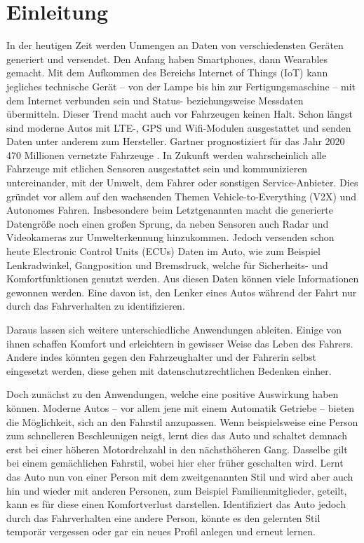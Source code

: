 %
%
%
%
%


\chapter{Einleitung}
\label{chap:intro}

In der heutigen Zeit werden Unmengen an Daten von verschiedensten Geräten generiert und versendet. Den Anfang haben Smartphones, dann Wearables gemacht. Mit dem Aufkommen des Bereichs Internet of Things (IoT) kann jegliches technische Gerät – von der Lampe bis hin zur Fertigungsmaschine – mit dem Internet verbunden sein und Status- beziehungsweise Messdaten übermitteln. Dieser Trend macht auch vor Fahrzeugen keinen Halt. Schon längst sind moderne Autos mit LTE-, GPS und Wifi-Modulen ausgestattet und senden Daten unter anderem zum Hersteller. Gartner prognostiziert für das Jahr 2020 470 Millionen vernetzte Fahrzeuge \cite{Gartner2019}. In Zukunft werden wahrscheinlich alle Fahrzeuge mit etlichen Sensoren ausgestattet sein und kommunizieren untereinander, mit der Umwelt, dem Fahrer oder sonstigen Service-Anbieter. Dies gründet vor allem auf den wachsenden Themen Vehicle-to-Everything (V2X) und Autonomes Fahren. Insbesondere beim Letztgenannten macht die generierte Datengröße noch einen großen Sprung, da neben Sensoren auch Radar und Videokameras zur Umwelterkennung hinzukommen. Jedoch versenden schon heute Electronic Control Units (ECUs) Daten im Auto, wie zum Beispiel Lenkradwinkel, Gangposition und Bremsdruck, welche für Sicherheits- und Komfortfunktionen genutzt werden. Aus diesen Daten können viele Informationen gewonnen werden. Eine davon ist, den Lenker eines Autos während der Fahrt nur durch das Fahrverhalten zu identifizieren.

Daraus lassen sich weitere unterschiedliche Anwendungen ableiten. Einige von ihnen schaffen Komfort und erleichtern in gewisser Weise das Leben des Fahrers. Andere indes könnten gegen den Fahrzeughalter und der Fahrerin selbst eingesetzt werden, diese gehen mit datenschutzrechtlichen Bedenken einher.

Doch zunächst zu den Anwendungen, welche eine positive Auswirkung haben können. Moderne Autos – vor allem jene mit einem Automatik Getriebe – bieten die Möglichkeit, sich an den Fahrstil anzupassen. Wenn beispielsweise eine Person zum schnelleren Beschleunigen neigt, lernt dies das Auto und schaltet demnach erst bei einer höheren Motordrehzahl in den nächsthöheren Gang. Dasselbe gilt bei einem gemächlichen Fahrstil, wobei hier eher früher geschalten wird. Lernt das Auto nun von einer Person mit dem zweitgenannten Stil und wird aber auch hin und wieder mit anderen Personen, zum Beispiel Familienmitglieder, geteilt, kann es für diese einen Komfortverlust darstellen. Identifiziert das Auto jedoch durch das Fahrverhalten eine andere Person, könnte es den gelernten Stil temporär vergessen oder gar ein neues Profil anlegen und erneut lernen.

